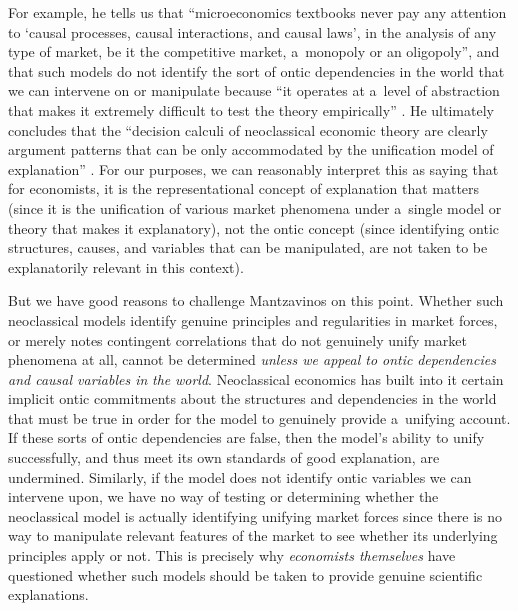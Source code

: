 For example, he tells us that ``microeconomics textbooks never pay any attention to ‘causal processes, causal interactions, and causal laws', in the analysis of any type of market, be it the competitive market, a~monopoly or an oligopoly'', and that such models do not identify the sort of ontic dependencies in the world that we can intervene on or manipulate because ``it operates at a~level of abstraction that makes it extremely difficult to test the theory empirically''
\parencite[][p.13]{mantzavinos_explanatory_2016}. %
 He ultimately concludes that the ``decision calculi of neoclassical economic theory are clearly argument patterns that can be only accommodated by the unification model of explanation'' 
\parencite[][p.13]{mantzavinos_explanatory_2016}. %
 For our purposes, we can reasonably interpret this as saying that for economists, it is the representational concept of explanation that matters (since it is the unification of various market phenomena under a~single model or theory that makes it explanatory), not the ontic concept (since identifying ontic structures, causes, and variables that can be manipulated, are not taken to be explanatorily relevant in this context).

But we have good reasons to challenge Mantzavinos on this point. Whether such neoclassical models identify genuine principles and regularities in market forces, or merely notes contingent correlations that do not genuinely unify market phenomena at all, cannot be determined \textit{unless we appeal to ontic} \textit{dependencies} \textit{and causal variables in} \textit{the} \textit{world}. Neoclassical economics has built into it certain implicit ontic commitments about the structures and dependencies in the world that must be true in order for the model to genuinely provide a~unifying account. If these sorts of ontic dependencies are false, then the model's ability to unify successfully, and thus meet its own standards of good explanation, are undermined. Similarly, if the model does not identify ontic variables we can intervene upon, we have no way of testing or determining whether the neoclassical model is actually identifying unifying market forces since there is no way to manipulate relevant features of the market to see whether its underlying principles apply or not. This is precisely why \textit{economists themselves} have questioned whether such models should be taken to provide genuine scientific explanations.

